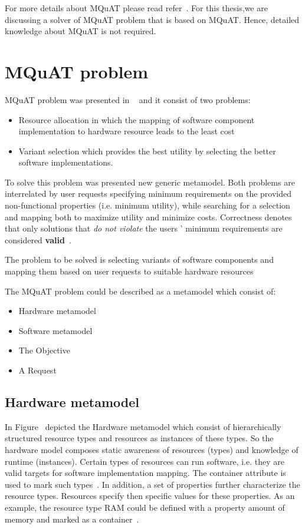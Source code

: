 For more details about MQuAT please read refer~\cite{gotz13}. For this thesis,we are discussing a solver of MQuAT problem that is based on MQuAT. Hence, detailed knowledge about MQuAT is not required. 


\section{MQuAT problem}

MQuAT problem was presented in ~\cite{gotz18} and it consist of two problems:

\begin{itemize}
	\item Resource allocation in which the mapping of software component implementation to hardware resource leads to the least cost
	\item Variant selection which provides the best utility by selecting the better software implementations.
\end{itemize} 

To solve this problem was presented new generic metamodel. Both problems are interrelated by user requests specifying minimum requirements on the provided non-functional properties (i.e. minimum utility), while searching for a selection and mapping both to maximize utility and minimize costs. Correctness denotes that only solutions that \textit{do not violate} the users ' minimum requirements are considered \textbf{valid}~\cite{gotz18}.

The problem to be solved is selecting variants of software components and mapping them based on user requests to suitable hardware resources~\cite{gotz18}

The MQuAT problem could be described as a metamodel which consist of:
\begin{itemize}
	\item Hardware metamodel
	\item Software metamodel
	\item The Objective
	\item A Request
\end{itemize}

\subsection{Hardware metamodel}
In Figure~\label{HWmodel} depicted the Hardware metamodel which consist of hierarchically structured resource types and resources as instances of these types. So the hardware model composes static awareness of resources (types) and knowledge of runtime (instances). Certain types of resources can run software, i.e. they are valid targets for software implementation mapping. The container attribute is used to mark such types~\cite{gotz18}.
In addition, a set of properties further characterize the resource types. Resources specify then specific values for these properties. As an example, the resource type RAM could be defined with a property amount of memory and marked as a container~\cite{gotz18}. 
  
